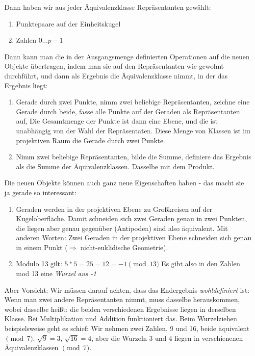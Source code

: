 \documentclass{article}
\begin{document}
Dann haben wir aus jeder Äquivalenzklasse Repräsentanten gewählt:

\begin{enumerate}
\item Punktepaare auf der Einheitskugel
\item Zahlen $0 \ldots p-1$
\end{enumerate}

Dann kann man die in der Ausgangsmenge definierten Operationen auf die neuen
Objekte übertragen, indem man sie auf den Repräsentanten wie gewohnt
durchführt, und dann als Ergebnis die Äquivalenzklasse nimmt, in der das
Ergebnis liegt:

\begin{enumerate}
\item Gerade durch zwei Punkte, nimm zwei beliebige Repräsentanten,
zeichne eine Gerade durch beide, fasse alle Punkte auf der Geraden als
Repräsentanten auf, Die Gesamtmenge der Punkte ist dann eine Ebene, und die
ist unabhängig von der Wahl der Repräsentaten. Diese Menge von Klassen ist im
projektiven Raum die Gerade durch zwei Punkte.
\item Nimm zwei beliebige Repräsentanten, bilde die Summe, definiere das
Ergebnis als die Summe der Äquivalenzklassen. Dasselbe mit dem Produkt.
\end{enumerate}

Die neuen Objekte können auch ganz neue Eigenschaften haben - das macht sie ja
gerade so interessant:

\begin{enumerate}
\item Geraden werden in der projektiven Ebene zu Großkreisen auf der
  Kugeloberfläche. Damit schneiden sich zwei Geraden genau in zwei Punkten,
  die liegen aber genau gegenüber (Antipoden) sind also äquivalent. Mit
  anderen Worten: Zwei Geraden in der projektiven Ebene schneiden sich genau
  in einem Punkt ($\Rightarrow$ nicht-euklidische Geometrie).
\item Modulo 13 gilt: $ 5 * 5 = 25 = 12 = -1 \pmod{13} $
  Es gibt also in den Zahlen mod 13 eine \emph{Wurzel aus -1}
\end{enumerate}

Aber Vorsicht: Wir müssen darauf achten, dass das Endergebnis \emph{wohldefiniert}
ist: Wenn man zwei andere Repräsentanten nimmt, muss dasselbe herauskommen,
wobei dasselbe heißt: die beiden verschiedenen Ergebnisse liegen in derselben
Klasse. Bei Multiplikation und Addition funktioniert das. Beim Wurzelziehen
beispielsweise geht es schief: Wir nehmen zwei Zahlen, 9 und 16, beide
äquivalent $\pmod 7$. $\sqrt 9 = 3$, $\sqrt{16} = 4$, aber die Wurzeln
3 und 4 liegen in verschienenen Äquivalenzklassen $\pmod 7$.
\end{document}
